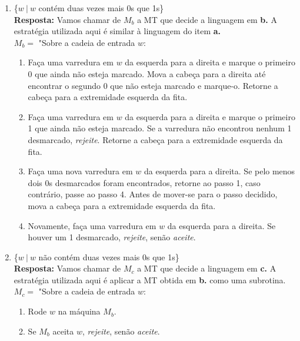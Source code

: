 \begin{enumerate}[label={\textbf{\alph*.}}]
\item \{$w\ |\ w$ contém duas vezes mais 0s que 1s\}\\[3pt]
\textbf{Resposta: } Vamos chamar de $M_b$ a MT que decide a linguagem em \textbf{b.} A estratégia utilizada aqui é similar à linguagem do item \textbf{a.}\\[3pt]
$M_b = $ "Sobre a cadeia de entrada $w$:
\begin{enumerate}[label={\textbf{\arabic*.}}, leftmargin=1in]
\item Faça uma varredura em $w$ da esquerda para a direita e marque o primeiro 0 que ainda não esteja marcado. Mova a cabeça para a direita até encontrar o segundo 0 que não esteja marcado e marque-o. Retorne a cabeça para a extremidade esquerda da fita.
\item Faça uma varredura em $w$ da esquerda para a direita e marque o primeiro 1 que ainda não esteja marcado. Se a varredura não encontrou nenhum 1 desmarcado, \textit{rejeite}. Retorne a cabeça para a extremidade esquerda da fita.
\item Faça uma nova varredura em $w$ da esquerda para a direita. Se pelo menos dois 0s desmarcados foram encontrados, retorne ao passo 1, caso contrário, passe ao passo 4. Antes de mover-se para o passo decidido, mova a cabeça para a extremidade esquerda da fita.
\item Novamente, faça uma varredura em $w$ da esquerda para a direita. Se houver um 1 desmarcado, \textit{rejeite}, senão \textit{aceite}.
\end{enumerate}

\item \{$w\ |\ w$ não contém duas vezes mais 0s que 1s\}\\[3pt]
\textbf{Resposta: } Vamos chamar de $M_c$ a MT que decide a linguagem em \textbf{c.} A estratégia utilizada aqui é aplicar a MT obtida em \textbf{b.} como uma subrotina.\\[3pt]
$M_c = $ "Sobre a cadeia de entrada $w$:
\begin{enumerate}[label={\textbf{\arabic*.}}, leftmargin=1in]
\item Rode $w$ na máquina $M_b$.
\item Se $M_b$ aceita $w$, \textit{rejeite}, senão \textit{aceite}.
\end{enumerate}
\end{enumerate}